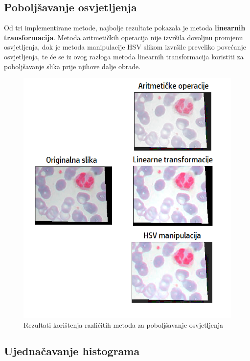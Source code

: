 \documentclass[12pt,a4paper]{article}
\begin{document}
\newpage

\subsection{Poboljšavanje osvjetljenja}

Od tri implementirane metode, najbolje rezultate pokazala je metoda \textbf{linearnih transformacija}. Metoda aritmetičkih operacija nije izvršila dovoljnu promjenu osvjetljenja, dok je metoda manipulacije HSV slikom izvršile preveliko povećanje osvjetljenja, te će se iz ovog razloga metoda linearnih transformacija koristiti za poboljšavanje slika prije njihove dalje obrade.

\begin{figure}[H]

\center
\includegraphics[scale=0.9]{slikaOsvjetljenje.png}
\caption{Rezultati korištenja različitih metoda za poboljšavanje osvjetljenja}
	
\end{figure}

\newpage

\subsection{Ujednačavanje histograma}
\end{document}
